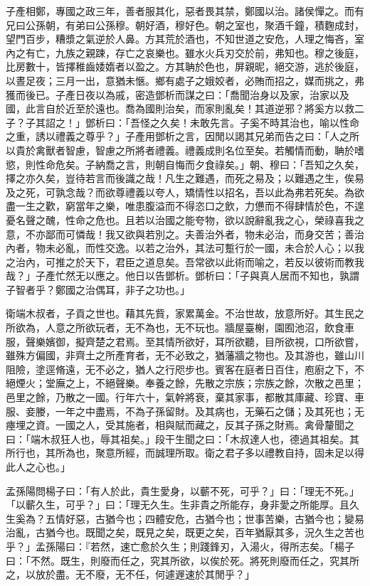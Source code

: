 \begin{pinyinscope}
子產相鄭，專國之政三年，善者服其化，惡者畏其禁，鄭國以治。諸侯憚之。而有兄曰公孫朝，有弟曰公孫穆。朝好酒，穆好色。朝之室也，聚酒千鐘，積麴成封，望門百步，糟漿之氣逆於人鼻。方其荒於酒也，不知世道之安危，人理之悔吝，室內之有亡，九族之親踈，存亡之哀樂也。雖水火兵刃交於前，弗知也。穆之後庭，比房數十，皆擇稚齒婑媠者以盈之。方其聃於色也，屏親昵，絕交游，逃於後庭，以晝足夜；三月一出，意猶未愜。鄉有處子之娥姣者，必賄而招之，媒而挑之，弗獲而後已。子產日夜以為戚，密造鄧析而謀之曰：「喬聞治身以及家，治家以及國，此言自於近至於遠也。喬為國則治矣，而家則亂矣！其道逆邪？將奚方以救二子？子其詔之！」鄧析曰：「吾怪之久矣！未敢先言。子奚不時其治也，喻以性命之重，誘以禮義之尊乎？」子產用鄧析之言，因閒以謁其兄弟而告之曰：「人之所以貴於禽獸者智慮，智慮之所將者禮義。禮義成則名位至矣。若觸情而動，聃於嗜慾，則性命危矣。子納喬之言，則朝自悔而夕食祿矣。」朝、穆曰：「吾知之久矣，擇之亦久矣，豈待若言而後識之哉！凡生之難遇，而死之易及；以難遇之生，俟易及之死，可孰念哉？而欲尊禮義以夸人，矯情性以招名，吾以此為弗若死矣。為欲盡一生之歡，窮當年之樂，唯患腹溢而不得恣口之飲，力憊而不得肆情於色，不遑憂名聲之醜，性命之危也。且若以治國之能夸物，欲以說辭亂我之心，榮祿喜我之意，不亦鄙而可憐哉！我又欲與若別之。夫善治外者，物未必治，而身交苦；善治內者，物未必亂，而性交逸。以若之治外，其法可蹔行於一國，未合於人心；以我之治內，可推之於天下，君臣之道息矣。吾常欲以此術而喻之，若反以彼術而教我哉？」子產忙然无以應之。他日以告鄧析。鄧析曰：「子與真人居而不知也，孰謂子智者乎？鄭國之治偶耳，非子之功也。」

衛端木叔者，子貢之世也。藉其先貲，家累萬金。不治世故，放意所好。其生民之所欲為，人意之所欲玩者，无不為也，无不玩也。牆屋臺榭，園囿池沼，飲食車服，聲樂嬪御，擬齊楚之君焉。至其情所欲好，耳所欲聽，目所欲視，口所欲嘗，雖殊方偏國，非齊土之所產育者，无不必致之，猶藩牆之物也。及其游也，雖山川阻險，塗逕脩遠，无不必之，猶人之行咫步也。賓客在庭者日百住，庖廚之下，不絕煙火；堂廡之上，不絕聲樂。奉養之餘，先散之宗族；宗族之餘，次散之邑里；邑里之餘，乃散之一國。行年六十，氣幹將衰，棄其家事，都散其庫藏、珍寶、車服、妾媵，一年之中盡焉，不為子孫留財。及其病也，无藥石之儲；及其死也；无瘞埋之資。一國之人，受其施者，相與賦而藏之，反其子孫之財焉。禽骨釐聞之曰：「端木叔狂人也，辱其祖矣。」段干生聞之曰：「木叔達人也，德過其祖矣。其所行也，其所為也，聚意所經，而誠理所取。衛之君子多以禮教自持，固未足以得此人之心也。」

孟孫陽問楊子曰：「有人於此，貴生愛身，以蘄不死，可乎？」曰：「理无不死。」「以蘄久生，可乎？」曰：「理无久生。生非貴之所能存，身非愛之所能厚。且久生奚為？五情好惡，古猶今也；四體安危，古猶今也；世事苦樂，古猶今也；變易治亂，古猶今也。既聞之矣，既見之矣，既更之矣，百年猶厭其多，況久生之苦也乎？」孟孫陽曰：『若然，速亡愈於久生；則踐鋒刃，入湯火，得所志矣。「楊子曰：「不然。既生，則廢而任之，究其所欲，以俟於死。將死則廢而任之，究其所之，以放於盡。无不廢，无不任，何遽遟速於其閒乎？」


\end{pinyinscope}
